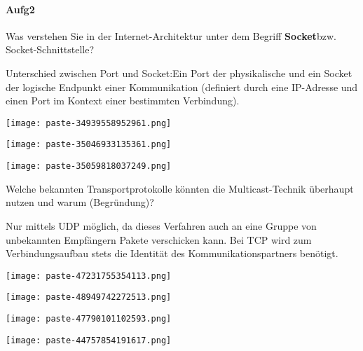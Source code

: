 \documentclass{article}
\begin{document}
\paragraph{Aufg2}
\begin{tcolorbox}[colback=white!10!white,colframe=lightgray!75!black,
  savelowerto=\jobname_ex.tex,breakable,enhanced,lines before break=40]

\justifying
Was verstehen Sie in der Internet-Architektur unter dem Begriff \textbf{Socket}bzw. Socket-Schnittstelle?

\tcblower

\justifying
Unterschied zwischen Port und Socket:Ein Port der physikalische und ein Socket der logische Endpunkt einer Kommunikation (definiert durch eine IP-Adresse und einen Port im Kontext einer bestimmten Verbindung).\begin{center}
\texttt{[image: paste-34939558952961.png]}
\end{center}
\begin{center}
\texttt{[image: paste-35046933135361.png]}
\end{center}
\begin{center}
\texttt{[image: paste-35059818037249.png]}
\end{center}

\end{tcolorbox}
\begin{tcolorbox}[colback=white!10!white,colframe=lightgray!75!black,
  savelowerto=\jobname_ex.tex,breakable,enhanced,lines before break=40]

\justifying
Welche bekannten Transportprotokolle könnten die Multicast-Technik überhaupt nutzen und warum (Begründung)?

\tcblower

\justifying
Nur mittels UDP möglich, da dieses Verfahren auch an eine Gruppe von unbekannten Empfängern Pakete verschicken kann. Bei TCP wird zum Verbindungsaufbau stets die Identität des Kommunikationspartners benötigt.\begin{center}
\texttt{[image: paste-47231755354113.png]}
\end{center}
\begin{center}
\texttt{[image: paste-48949742272513.png]}
\end{center}
\begin{center}
\texttt{[image: paste-47790101102593.png]}
\end{center}
\begin{center}
\texttt{[image: paste-44757854191617.png]}
\end{center}

\end{tcolorbox}
\end{document}
